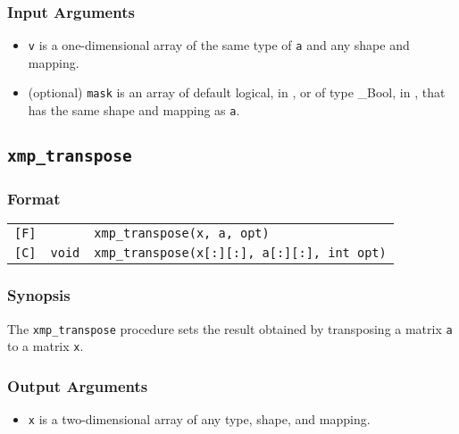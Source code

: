 \subsubsection*{Input Arguments}
\begin{itemize}
 \item {\tt v} is a one-dimensional array of the same type of {\tt a}
       and any shape and mapping.
 \item (optional) {\tt mask} is an array of default logical, in {\XMPF},
	   or of type \_Bool, in {\XMPC}, that has the same shape and
	   mapping as {\tt a}.
	   
\end{itemize}


\subsection{\tt xmp\_transpose}

\subsubsection*{Format}

\begin{tabular}{lll}

\verb![F]!&            & {\tt xmp\_transpose(x, a, opt)}\\

\verb![C]!& {\tt void} & {\tt xmp\_transpose(x[:][:], a[:][:], int opt)}\\

\end{tabular}

\subsubsection*{Synopsis}

The {\tt xmp\_transpose} procedure sets the result obtained by
transposing a matrix {\tt a} to a matrix {\tt x}.

\subsubsection*{Output Arguments}
\begin{itemize}
 \item {\tt x} is a two-dimensional array of any type, shape, and mapping.
\end{itemize}

